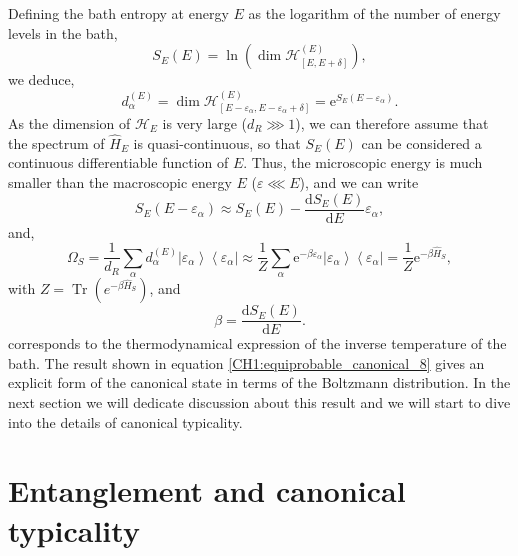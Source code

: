 \indent Defining the bath entropy at energy $E$ as the logarithm of the number of energy levels in the bath,
\begin{equation}
S_{E}(E)=\ln \left(\operatorname{dim} \mathcal{H}_{[E, E+\delta]}^{(E)}\right),
\label{CH1:equiprobable_canonical_5}
\end{equation}
we deduce,
\begin{equation}
d_{\alpha}^{(E)}=\operatorname{dim} \mathcal{H}_{\left[E-\varepsilon_{\alpha}, E-\varepsilon_{\alpha}+\delta\right]}^{(E)}=\mathrm{e}^{S_{E}\left(E-\varepsilon_{\alpha}\right)}.
\label{CH1:equiprobable_canonical_6}
\end{equation}
\indent As the dimension of $\mathcal{H}_{E}$ is very large ($d_R\ggg 1$), we can therefore assume that the spectrum of $\hat{H}_E$ is quasi-continuous, so that $S_E (E)$ can be considered a continuous differentiable function of $E$. Thus, the microscopic energy is much smaller than the macroscopic energy $E$ ($\varepsilon\lll E$), and we can write
\begin{equation}
S_{E}\left(E-\varepsilon_{\alpha}\right) \approx S_{E}(E)-\frac{\mathrm{d} S_{E}(E)}{\mathrm{d} E} \varepsilon_{\alpha},
\label{CH1:equiprobable_canonical_7}
\end{equation}
and,
\begin{equation}
\Omega_{S}=
\frac{1}{d_{R}} \sum_{\alpha} d_{\alpha}^{(E)}\left|\varepsilon_{\alpha}\right\rangle\left\langle\varepsilon_{\alpha}\right|
\approx \frac{1}{Z} \sum_{\alpha} \mathrm{e}^{-\beta \varepsilon_{\alpha}}\left| \varepsilon_{\alpha}\right\rangle\left\langle\varepsilon_{\alpha}\right|
=\frac{1}{Z} \mathrm{e}^{-\beta \hat{H}_{S}},
\label{CH1:equiprobable_canonical_8}
\end{equation}
with $Z=\operatorname{Tr}\left(e^{-\beta\hat{H}_S}\right)$, and 
\begin{equation}
\beta=\frac{\mathrm{d} S_{E}(E)}{\mathrm{d} E}.
\end{equation}
corresponds to the thermodynamical expression of the inverse temperature of the bath. The result shown in equation \eqref{CH1:equiprobable_canonical_8} gives an explicit form of the canonical state in terms of the Boltzmann distribution. In the next section we will dedicate discussion about this result and we will start to dive into the details of canonical typicality.

\section{Entanglement and canonical typicality}

